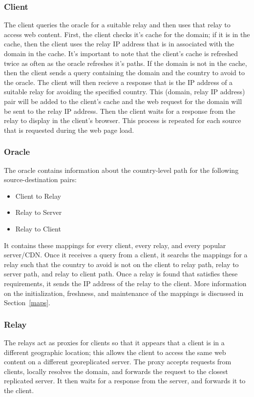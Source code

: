 \subsubsection{Client} The client queries the oracle for a suitable relay and then uses that relay to access web content.  First, the client checks it's cache for the domain; if it is in the cache, then the client uses the relay IP address that is in associated with the domain in the cache.  It's important to note that the client's cache is refreshed twice as often as the oracle refreshes it's paths.  If the domain is not in the cache, then the client sends a query containing the domain and the country to avoid to the oracle.  The client will then recieve a response that is the IP address of a suitable relay for avoiding the specified country.  This (domain, relay IP address) pair will be added to the client's cache and the web request for the domain will be sent to the relay IP address.  Then the client waits for a response from the relay to display in the client's browser.  This process is repeated for each source that is requested during the web page load.  

\subsubsection{Oracle} The oracle contains information about the country-level path for the following source-destination pairs:

\begin{itemize}
\item Client to Relay
\item Relay to Server
\item Relay to Client
\end{itemize}

It contains these mappings for every client, every relay, and every popular server/CDN.  Once it receives a query from a client, it searchs the mappings for a relay such that the country to avoid is not on the client to relay path, relay to server path, and relay to client path.  Once a relay is found that satisfies these requirements, it sends the IP address of the relay to the client.  More information on the initialization, freshness, and maintenance of the mappings is discussed in Section~\ref{maps}.

\subsubsection{Relay} The relays act as proxies for clients so that it appears that a client is in a different geographic location; this allows the client to access the same web content on a different georeplicated server.  The proxy accepts requests from clients, locally resolves the domain, and forwards the request to the closest replicated server.  It then waits for a response from the server, and forwards it to the client.   

